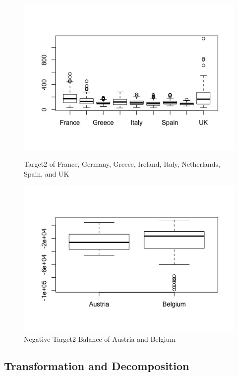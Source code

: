 \documentclass[12pt]{article}
\begin{document}
\begin{figure}[!tbp]
  \centering
  \begin{minipage}[b]{0.5\textwidth}
    \includegraphics[width=\textwidth]{Bal1.jpeg}
    \caption{Target2 of France, Germany, Greece, Ireland, Italy, Netherlands, Spain, and UK}
  \end{minipage}
  \hfill
  \begin{minipage}[b]{0.4\textwidth}
    \includegraphics[width=\textwidth]{Bal2.jpeg}
    \caption{Negative Target2 Balance of Austria and Belgium}
  \end{minipage}
\end{figure}
\subsection{Transformation and Decomposition}
\end{document}
